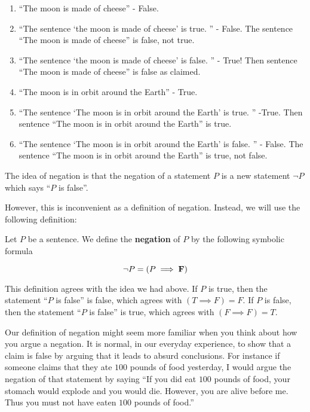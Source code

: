 \begin{solutions}
	
	\begin{enumerate}
	\item ``The moon is made of cheese'' - False.
	\item ``The sentence `the moon is made of cheese' is true. '' - False.  The sentence ``The moon is made of cheese'' is false, not true.
	\item ``The sentence `the moon is made of cheese' is false. '' - True!  Then sentence ``The moon is made of cheese'' is false as claimed.
	\item ``The moon is in orbit around the Earth''  - True.
	\item ``The sentence `The moon is in orbit around the Earth' is true. '' -True.  Then sentence ``The moon is in orbit around the Earth'' is true.
	\item ``The sentence `The moon is in orbit around the Earth' is false. '' - False.  The sentence ``The moon is in orbit around the Earth'' is true, not false.
\end{enumerate}
\end{solutions}

The idea of negation is that the negation of a statement $P$ is a new statement $\neg P$ which says ``$P$ is false''.

However, this is inconvenient as a definition of negation.  Instead, we will use the following definition:

\begin{definition} Let $P$ be a sentence.  We define the \textbf{negation} of $P$ by the following symbolic formula
	
	\[
	\neg P = (P \implies \textbf{\textrm{F}})
	\]
	
\end{definition}

This definition agrees with the idea we had above.  If $P$ is true, then the statement ``$P$ is false'' is false, which agrees with  $(T \implies F) = F$.  If $P$ is false, then the statement ``$P$ is false'' is true, which agrees with $(F \implies F) = T$.

Our definition of negation might seem more familiar when you think about how you argue a negation.  It is normal, in our everyday experience, to show that a claim is false by arguing that it leads to absurd conclusions.  For instance if someone claims that they ate $100$ pounds of food yesterday, I would argue the negation of that statement by saying ``If you did eat $100$ pounds of food, your stomach would explode and you would die.  However, you are alive before me.  Thus you must not have eaten $100$ pounds of food.''

